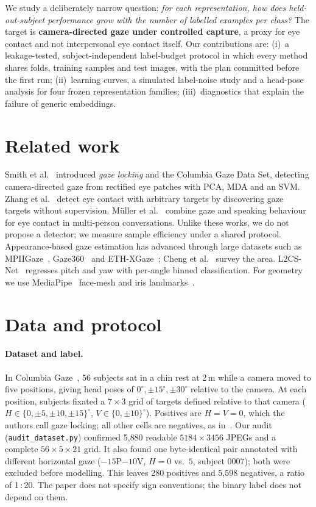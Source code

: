 \documentclass[10pt,twocolumn]{article}
\begin{document}
We study a deliberately narrow question: \emph{for each representation, how does held-out-subject
performance grow with the number of labelled examples per class?} The target is \textbf{camera-directed
gaze under controlled capture}, a proxy for eye contact and not interpersonal eye contact itself.
Our contributions are:
(i)~a leakage-tested, subject-independent label-budget protocol in which every method shares folds,
training samples and test images, with the plan committed before the first run;
(ii)~learning curves, a simulated label-noise study and a head-pose analysis for four frozen representation families;
(iii)~diagnostics that explain the failure of generic embeddings.

\section{Related work}
Smith et al.~\cite{smith2013gazelocking} introduced \emph{gaze locking} and the Columbia Gaze Data Set,
detecting camera-directed gaze from rectified eye patches with PCA, MDA and an SVM.
Zhang et al.~\cite{zhang2017everyday} detect eye contact with arbitrary targets by discovering
gaze targets without supervision. Müller et al.~\cite{muller2018robust} combine gaze and speaking
behaviour for eye contact in multi-person conversations. Unlike these works, we do not propose a
detector; we measure sample efficiency under a shared protocol.
Appearance-based gaze estimation has advanced through large datasets such as
MPIIGaze~\cite{zhang2015mpiigaze,zhang2019mpiigaze}, Gaze360~\cite{kellnhofer2019gaze360} and
ETH-XGaze~\cite{zhang2020ethxgaze}; Cheng et al.~\cite{cheng2024survey} survey the area.
L2CS-Net~\cite{abdelrahman2023l2cs} regresses pitch and yaw with per-angle binned classification.
For geometry we use MediaPipe~\cite{lugaresi2019mediapipe} face-mesh and iris
landmarks~\cite{kartynnik2019facemesh,ablavatski2020iris}.

\section{Data and protocol}
\paragraph{Dataset and label.}
In Columbia Gaze~\cite{smith2013gazelocking}, 56 subjects sat in a chin rest at 2\,m while
a camera moved to five positions, giving head poses of $0^\circ,\pm15^\circ,\pm30^\circ$ relative to the camera.
At each position, subjects fixated a $7\times3$ grid of targets defined relative to that camera
($H\in\{0,\pm5,\pm10,\pm15\}^\circ$, $V\in\{0,\pm10\}^\circ$). Positives are $H{=}V{=}0$,
which the authors call gaze locking; all other cells are negatives, as in~\cite{smith2013gazelocking}.
Our audit (\texttt{audit\_dataset.py}) confirmed 5{,}880 readable $5184{\times}3456$ JPEGs and a complete
$56\times5\times21$ grid. It also found one byte-identical pair annotated with different horizontal gaze
($-15$P$-10$V, $H{=}0$ vs.\ $5$, subject 0007); both were excluded before modelling.
This leaves 280 positives and 5{,}598 negatives, a ratio of 1\,:\,20. The paper does not specify sign conventions;
the binary label does not depend on them.
\end{document}
